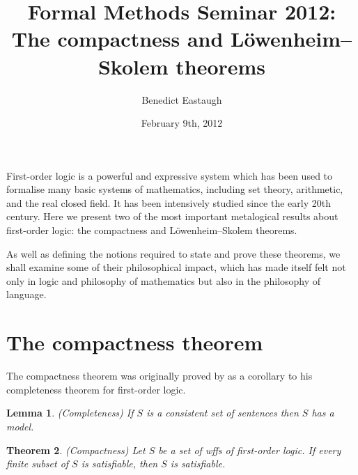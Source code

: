 \documentclass[10pt, a4paper, oneside]{article}
\title{Formal Methods Seminar 2012:\\
       The compactness and Löwenheim--Skolem theorems}
\author{Benedict Eastaugh}
\date{February 9th, 2012}
\newtheorem{thm}{Theorem}[section]
\theoremstyle{definition}
\theoremstyle{remark}
\theoremstyle{plain}
\newtheorem{lem}[thm]{Lemma}
\theoremstyle{plain}
\begin{document}
\maketitle

First-order logic is a powerful and expressive system which has been used to
formalise many basic systems of mathematics, including set theory, arithmetic,
and the real closed field. It has been intensively studied since the early 20th
century. Here we present two of the most important metalogical results about
first-order logic: the compactness and Löwenheim--Skolem theorems.

As well as defining the notions required to state and prove these theorems, we
shall examine some of their philosophical impact, which has made itself felt not
only in logic and philosophy of mathematics but also in the philosophy of
language.


\section{The compactness theorem}

The compactness theorem was originally proved by \citet{godel1930} as a
corollary to his completeness theorem for first-order logic.

\begin{lem}
    \label{completeness}
    (Completeness)
    If $S$ is a consistent set of sentences then $S$ has a model.
\end{lem}

\begin{thm}
    \label{compactness}
    (Compactness)
    Let $S$ be a set of wffs of first-order logic. If every finite subset of $S$
    is satisfiable, then $S$ is satisfiable.
\end{thm}
\end{document}
